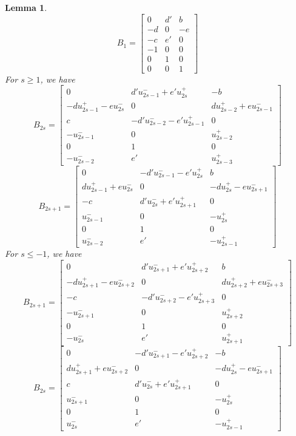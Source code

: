 \documentclass{amsart}
\newtheorem{lemma}[theorem]{Lemma}
\numberwithin{theorem}{section}
\begin{document}
  \begin{lemma}
    \[B_1=\left[\begin{array}{ccc} 0 & d' & b \\ -d & 0 & -e\\ -c & e' & 0\\ -1 & 0 & 0\\ 0 & 1 & 0\\ 0 & 0 & 1\end{array}\right]\]
    For $s\ge 1$, we have 
    \[B_{2s}=\left[\begin{array}{ccc} 0 & d'u_{2s-1}^- + e'u_{2s}^+ & -b \\ -du_{2s-1}^+ - eu_{2s}^- & 0 & du_{2s-2}^+ + eu_{2s-1}^-\\ c &  -d'u_{2s-2}^- - e'u_{2s-1}^+ & 0\\ -u_{2s-1}^- & 0 & u_{2s-2}^+\\ 0 & 1 & 0 \\ -u_{2s-2}^- & e' & u_{2s-3}^+\end{array}\right]\]
    \[B_{2s+1}=\left[\begin{array}{ccc} 0 & -d'u_{2s-1}^- - e'u_{2s}^+ & b \\ du_{2s-1}^+ + eu_{2s}^- & 0 & -du_{2s}^+ - eu_{2s+1}^-\\ -c &  d'u_{2s}^- + e'u_{2s+1}^+ & 0\\ u_{2s-1}^- & 0 & -u_{2s}^+\\ 0 & 1 & 0 \\ u_{2s-2}^- & e' & -u_{2s-1}^+\end{array}\right]\]
    For $s\le -1$, we have
    \[B_{2s+1}=\left[\begin{array}{ccc} 0 & d'u_{2s+1}^- + e'u_{2s+2}^+ & b \\ -du_{2s+1}^+ - eu_{2s+2}^- & 0 & du_{2s+2}^+ + eu_{2s+3}^-\\ -c &  -d'u_{2s+2}^- - e'u_{2s+3}^+ & 0\\ -u_{2s+1}^- & 0 & u_{2s+2}^+\\ 0 & 1 & 0 \\ -u_{2s}^- & e' & u_{2s+1}^+\end{array}\right]\]
    \[B_{2s}=\left[\begin{array}{ccc} 0 & -d'u_{2s+1}^- - e'u_{2s+2}^+ & -b \\ du_{2s+1}^+ + eu_{2s+2}^- & 0 & -du_{2s}^+ - eu_{2s+1}^-\\ c &  d'u_{2s}^- + e'u_{2s+1}^+ & 0\\ u_{2s+1}^- & 0 & -u_{2s}^+\\ 0 & 1 & 0 \\ u_{2s}^- & e' & -u_{2s-1}^+\end{array}\right]\]
  \end{lemma}
\end{document}
